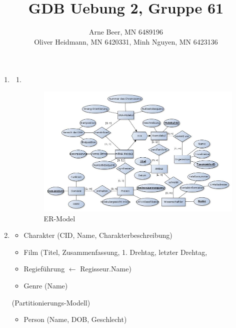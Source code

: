 \documentclass{article}
\title{GDB Uebung 2, Gruppe 61}
\author{Arne Beer, MN 6489196\\
        Oliver Heidmann, MN 6420331,
        Minh Nguyen, MN 6423136}
\begin{document}
    \maketitle
    \begin{enumerate}
        \item   \begin{enumerate}
                        \item $ $ \\ 
                            \begin{figure}[ht!]
                                \centering
                                \includegraphics[width=180mm]{GDB_BLatt3_Auf1.jpg}
                                \caption{ER-Model}
                                \label{overflow}
                            \end{figure}
                \end{enumerate} 
                \newpage
        \item
                \begin{itemize}
                    \item Charakter (CID, Name, Charakterbeschreibung)
                    \item Film (Titel, Zusammenfassung, 1. Drehtag, letzter Drehtag,
                    \item Regieführung $\leftarrow$ Regisseur.Name)
                    \item Genre (Name)
                \end{itemize}
                (Partitionierungs-Modell)
                \begin{itemize}
                    \item Person (Name, DOB, Geschlecht)\\         

\end{itemize}
\end{enumerate}
\end{document}
